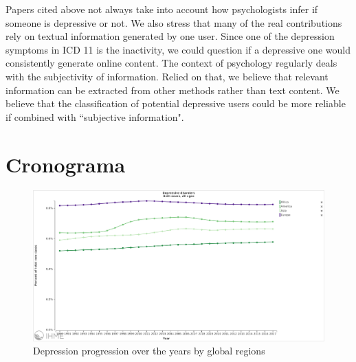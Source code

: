 \documentclass[11pt, notitlepage]{article} %
\begin{document}
Papers cited above not always take into account how psychologists infer if someone is depressive or not. 
We also stress that many of the real contributions rely on textual information generated by one user. Since one of the depression symptoms in ICD 11 is the inactivity, we could question if a depressive one would consistently generate online content.
The context of psychology regularly deals with the subjectivity of information. Relied on that, we believe that relevant information can be extracted from other methods rather than text content. We believe that the classification of potential depressive users could be more reliable if combined with ``subjective information".

\section*{Cronograma}

\appendix
\newpage
\begin{figure}
	\centering
	\includegraphics[scale=.225]{Figures/depressionprogression.png}
	\caption{Depression progression over the years by global regions} 
	\label{fig:depressionmap}
\end{figure}
\section{}
\end{document}
